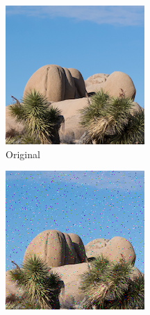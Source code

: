 \documentclass{article}
\begin{document}
\begin{figure}[htb]
    \centering
    \begin{subfigure}[b]{0.32\textwidth}
        \centering
        \includegraphics[width=\textwidth]{../Resource/cropped-image.png}
        \caption{Original}
        \label{fig:cropped-image-cyclic-15-5-original}
    \end{subfigure}
    \hfill
    \begin{subfigure}[b]{0.32\textwidth}
        \centering
        \includegraphics[width=\textwidth]{../Result/Cyclic/15-5/cropped-cyclic-bsc-output.png}

\end{subfigure}
\end{figure}
\end{document}
